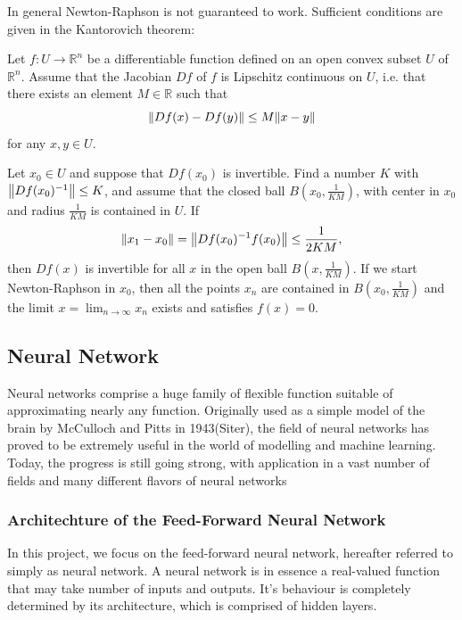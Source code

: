 In general Newton-Raphson is not guaranteed to work. Sufficient conditions are given in the Kantorovich theorem:
\begin{theorem}
  Let $f\colon U\to\mathbb{R}^n$ be a differentiable function defined on an open convex subset $U$ of $\mathbb{R}^n$. Assume that the Jacobian $Df$ of $f$ is Lipschitz continuous on $U$, i.e. that there exists an element $M\in\mathbb{R}$ such that
  \begin{equation*}
    \norm{Df(x)-Df(y)}\le M\norm{x-y}
  \end{equation*}
  for any $x,y\in U$.

Let $x_0\in U$ and suppose that $Df(x_0)$ is invertible. Find a number $K$ with $\norm{Df(x_0)^{-1}}\le K$, and assume that the closed ball $B\left(x_0,\frac{1}{KM}\right)$, with center in $x_0$ and radius $\frac{1}{KM}$ is contained in $U$. If
\begin{equation*}
  \norm{x_1-x_0}=\norm{Df(x_0)^{-1}f(x_0)}\le\frac{1}{2KM},
\end{equation*}
then $Df(x)$ is invertible for all $x$ in the open ball $B\left(x,\frac{1}{KM}\right)$. If we start Newton-Raphson in $x_0$, then all the points $x_n$ are contained in $B\left(x_0,\frac{1}{KM}\right)$ and the limit $x=\lim_{n\to\infty}x_n$ exists and satisfies $f(x)=0$.
\end{theorem}

\subsection{Neural Network}\label{sec:dnn theory}
Neural networks comprise a huge family of flexible function suitable of approximating nearly any function. Originally used as a simple model of the brain 
by McCulloch and Pitts in 1943(Siter), the field of neural networks has proved to be extremely useful in the world of modelling and machine learning. Today, the progress is still going strong, with application in a vast number of fields and many different flavors of neural networks

\subsubsection{Architechture of the Feed-Forward Neural Network}
In this project, we focus on the feed-forward neural network, hereafter referred
to simply as neural network. A neural network is in essence a real-valued function that may take number of inputs and outputs. It's behaviour is completely determined by its architecture, which is comprised of hidden layers.


